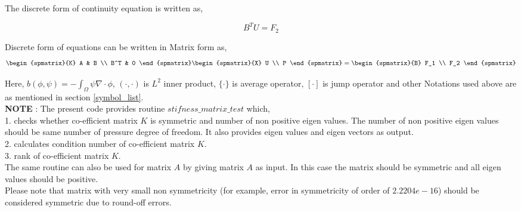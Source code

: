 \documentclass[a4paper,12pt]{book}
\begin{document}
The discrete form of continuity equation is written as,

\begin{equation} \label{continuity discrete}
B^T U  = F_2
\end{equation}

Discrete form of equations can be written in Matrix form as, \\

\begin{equation} \label{Stokes_matrix}
\begin{spmatrix}{K}
    A & B \\
    B^T & 0
\end{spmatrix}
\begin{spmatrix}{X}
    U \\
    P
\end{spmatrix}
=
\begin{spmatrix}{B}
    F_1  \\
    F_2
\end{spmatrix}
\end{equation}

Here, $b(\phi,\psi) = -\int_{\Omega} \psi \nabla \cdot \phi$, $(\cdot , \cdot)$ is $L^2$ inner product, $\{\cdot\}$ is average operator, $[\cdot]$ is jump operator and other Notations used above are as mentioned in section \ref{symbol_list}.\\

\textbf{NOTE} : The present code provides routine $stifness\_matrix\_test$ which, \\

1. checks whether co-efficient matrix $K$ is symmetric and number of non positive eigen values. The number of non positive eigen values should be same number of pressure degree of freedom. It also provides eigen values and eigen vectors as output.\\

2. calculates condition number of co-efficient matrix $K$. \\

3. rank of co-efficient matrix $K$.\\

The same routine can also be used for matrix $A$ by giving matrix $A$ as input. In this case the matrix should be symmetric and all eigen values should be positive.\\

Please note that matrix with very small non symmetricity (for example, error in symmetricity of order of $2.2204e-16$) should be considered symmetric due to round-off errors.
\end{document}
